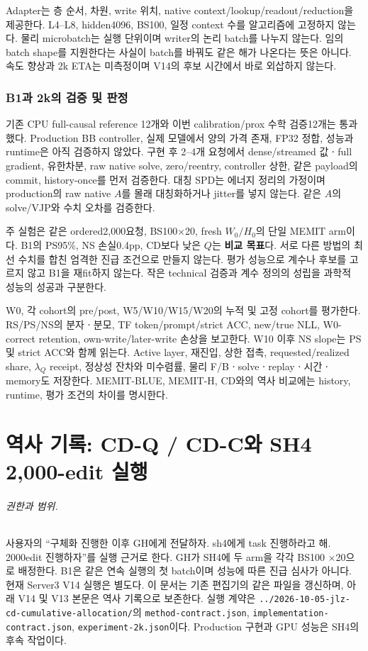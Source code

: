 \documentclass[11pt]{article}
\begin{document}
Adapter는 층 순서, 차원, write 위치, native context/lookup/readout/reduction을 제공한다.
L4--L8, hidden4096, BS100, 일정 context 수를 알고리즘에 고정하지 않는다.
물리 microbatch는 실행 단위이며 writer의 논리 batch를 나누지 않는다.
임의 batch shape를 지원한다는 사실이 batch를 바꿔도 같은 해가 나온다는 뜻은 아니다.
속도 향상과 2k ETA는 미측정이며 V14의 후보 시간에서 바로 외삽하지 않는다.

\section{B1과 2k의 검증 및 판정}
기존 CPU full-causal reference 12개와 이번 calibration/prox 수학 검증12개는 통과했다.
Production BB controller, 실제 모델에서 양의 가격 존재, FP32 정합,
성능과 runtime은 아직 검증하지 않았다.
구현 후 2--4개 요청에서 dense/streamed 값ㆍfull gradient,
유한차분, raw native solve, zero/reentry, controller 상한,
같은 payload의 commit, history-once를 먼저 검증한다.
대칭 SPD는 에너지 정리의 가정이며 production의 raw native $A$를
몰래 대칭화하거나 jitter를 넣지 않는다. 같은 $A$의 solve/VJP와 수치 오차를 검증한다.

주 실험은 같은 ordered2,000요청, BS100$\times$20, fresh $W_0/H_0$의 단일 MEMIT arm이다.
B1의 PS95\%, NS 손실0.4pp, CD보다 낮은 $Q$는 \textbf{비교 목표}다.
서로 다른 방법의 최선 수치를 합친 엄격한 진급 조건으로 만들지 않는다.
평가 성능으로 계수나 후보를 고르지 않고 B1을 재fit하지 않는다.
작은 technical 검증과 계수 정의의 성립을 과학적 성능의 성공과 구분한다.

W0, 각 cohort의 pre/post, W5/W10/W15/W20의 누적 및 고정 cohort를 평가한다.
RS/PS/NS의 분자ㆍ분모, TF token/prompt/strict ACC,
new/true NLL, W0-correct retention, own-write/later-write 손상을 보고한다.
W10 이후 NS slope는 PS 및 strict ACC와 함께 읽는다.
Active layer, 재진입, 상한 접촉, requested/realized share,
$\lambda_Q$ receipt, 정상성 잔차와 미수렴률,
물리 F/Bㆍsolveㆍreplayㆍ시간ㆍmemory도 저장한다.
MEMIT-BLUE, MEMIT-H, CD와의 역사 비교에는 history, runtime, 평가 조건의 차이를 명시한다.

\clearpage
\part*{역사 기록: CD-Q / CD-C와 SH4 2,000-edit 실행}
\paragraph{권한과 범위.}
사용자의 ``구체화 진행한 이후 GH에게 전달하자. sh4에게 task 진행하라고 해.
2000edit 진행하자''를 실행 근거로 한다. GH가 SH4에 두 arm을 각각 BS100 $\times$20으로
배정한다. B1은 같은 연속 실행의 첫 batch이며 성능에 따른 진급 심사가 아니다.
현재 Server3 V14 실행은 별도다. 이 문서는 기존 편집기의 같은 파일을 갱신하며,
아래 V14 및 V13 본문은 역사 기록으로 보존한다. 실행 계약은
\texttt{../2026-10-05-jlz-cd-cumulative-allocation/}의
\texttt{method-contract.json}, \texttt{implementation-contract.json},
\texttt{experiment-2k.json}이다. Production 구현과 GPU 성능은 SH4의 후속 작업이다.
\end{document}
